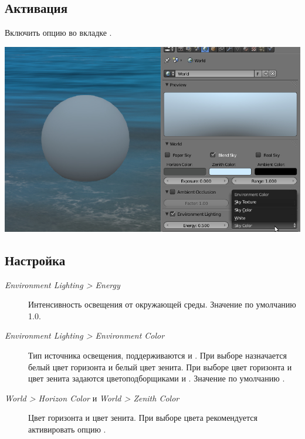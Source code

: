 \documentclass[a4paper,12pt,oneside]{sphinxmanual}
\begin{document}
\subsection{Активация}
\label{lighting:id6}
Включить опцию  во вкладке .

{\hfill\includegraphics[width=1.000\linewidth]{lighting_environment.jpg}\hfill}


\subsection{Настройка}
\label{lighting:id7}\begin{description}
\item[{\emph{Environment Lighting \textgreater{} Energy}}] \leavevmode
Интенсивность освещения от окружающей среды. Значение по умолчанию 1.0.

\item[{\emph{Environment Lighting \textgreater{} Environment Color}}] \leavevmode
Тип источника освещения, поддерживаются  и . При выборе  назначается белый цвет горизонта и белый цвет зенита. При выборе  цвет горизонта и цвет зенита задаются цветоподборщиками  и . Значение по умолчанию .

\item[{\emph{World \textgreater{} Horizon Color} и \emph{World \textgreater{} Zenith Color}}] \leavevmode
Цвет горизонта и цвет зенита. При выборе цвета рекомендуется активировать опцию .

\end{description}
\end{document}
